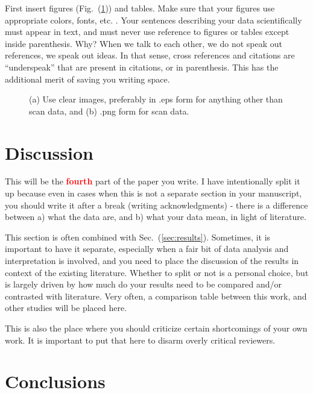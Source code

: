 \documentclass[12 pt]{article}
\begin{document}
First insert figures (Fig.~(\ref{fig:cv})) and tables. Make sure that your figures use appropriate colors, fonts, etc. \cite{mcnames:2006}. Your sentences describing your data scientifically must appear in text, and must never use reference to figures or tables except inside parenthesis. Why? When we talk to each other, we do not speak out references, we speak out ideas. In that sense, cross references and citations are ``underspeak'' that are present in citations, or in parenthesis. This has the additional merit of saving you writing space. 

\begin{figure}
\centering
{}
\caption{(a) Use clear images, preferably in .eps form for anything other than scan data, and (b) .png form for scan data.}
\label{fig:cv}
\end{figure}

\section{Discussion}
\label{sec:discussion}

This will be the \textbf{\Huge \textcolor{red}{fourth}} part of the paper you write. I have intentionally split it up because even in cases when this is not a separate section in your manuscript, you should write it after a break (writing acknowledgments) - there is a difference between a) what the data are, and b) what your data mean, in light of literature.

This section is often combined with Sec.~(\ref{sec:results}). Sometimes, it is important to have it separate, especially when a fair bit of data analysis and interpretation is involved, and you need to place the discussion of the results in context of the existing literature. Whether to split or not is a personal choice, but is largely driven by how much do your results need to be compared and/or contrasted with literature. Very often, a comparison table between this work, and other studies will be placed here.

This is also the place where you should criticize certain shortcomings of your own work. It is important to put that here to disarm overly critical reviewers.

\section{Conclusions}
\label{sec:conclusions}
\end{document}
